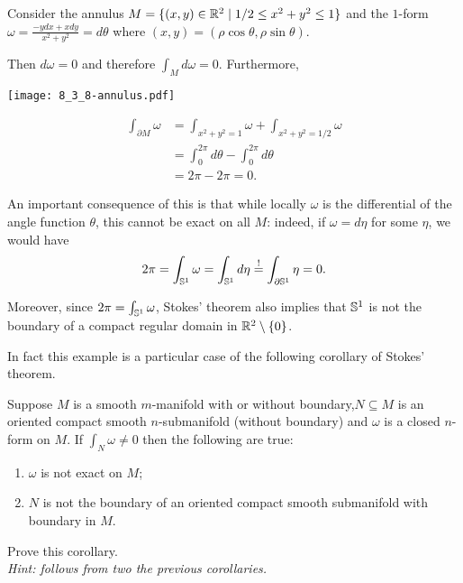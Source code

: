 \begin{example}
  Consider the annulus $M=\{(x,y)\in\mathbb{R}^2 \mid 1/2\leq x^2+y^2 \leq 1\}$ and the $1$-form $\omega = \frac{-y dx + x dy}{x^2 + y^2} = d\theta$ where $(x,y) = (\rho\cos\theta, \rho\sin\theta)$.
  
  Then $d\omega = 0$ and therefore $\int_M d\omega = 0$.
  Furthermore,
  \begin{marginfigure}
    \texttt{[image: 8\_3\_8-annulus.pdf]}
  \end{marginfigure}
  \begin{align}
    \int_{\partial M}\omega
    &= \int_{x^2 + y^2 =1} \omega + \int_{x^2+y^2 =1/2}\omega \\ 
    &= \int_{0}^{2\pi} d\theta - \int_0^{2\pi}d \theta \\
    &= 2\pi - 2\pi = 0.
  \end{align}

  An important consequence of this is that while locally $\omega$ is the differential of the angle function $\theta$, this cannot be exact on all $M$: indeed, if $\omega = d\eta$ for some $\eta$, we would have
  \begin{equation}
    2\pi = \int_{\mathbb{S}^1}\omega = \int_{\mathbb{S}^1}d\eta \overset{!}{=} \int_{\partial\mathbb{S}^1}\eta = 0.
  \end{equation}

  Moreover, since $2\pi = \int_{\mathbb{S}^1}\omega$, Stokes' theorem also implies that $\mathbb{S}^1$ is not the boundary of a compact regular domain in $\mathbb{R}^2\setminus\{0\}$.
\end{example}

In fact this example is a particular case of the following corollary of Stokes' theorem.

\begin{corollary}
  Suppose $M$ is a smooth $m$-manifold with or without boundary,$N\subseteq M$ is an oriented compact smooth $n$-submanifold (without boundary) and $\omega$ is a closed $n$-form on $M$.
  If $\int_N\omega \neq 0$ then the following are true:
  \begin{enumerate}
    \item $\omega$ is not exact on $M$;
    \item $N$ is not the boundary of an oriented compact smooth submanifold with boundary in $M$.
  \end{enumerate}
\end{corollary}
\begin{exercise}
  Prove this corollary. \\
  \textit{\small Hint: follows from two the previous corollaries.}
\end{exercise}
